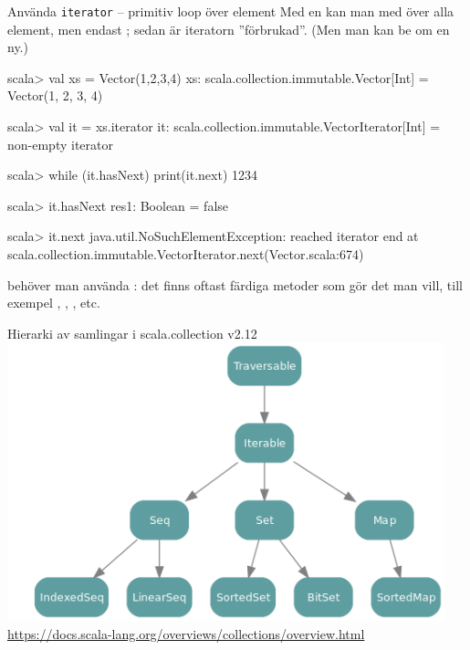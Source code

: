 \begin{Slide}{Använda \texttt{iterator} -- primitiv loop över element}\SlideFontSmall
Med en  kan man  med  över alla element, men endast ; sedan är iteratorn ''förbrukad''. (Men man kan be om en ny.)
\begin{REPL}
scala> val xs = Vector(1,2,3,4)
xs: scala.collection.immutable.Vector[Int] = Vector(1, 2, 3, 4)

scala> val it = xs.iterator
it: scala.collection.immutable.VectorIterator[Int] = non-empty iterator

scala> while (it.hasNext) print(it.next)
1234

scala> it.hasNext
res1: Boolean = false

scala> it.next
java.util.NoSuchElementException: reached iterator end
  at scala.collection.immutable.VectorIterator.next(Vector.scala:674)
\end{REPL}
 behöver man  använda : det finns oftast färdiga metoder som gör det man vill, till exempel , , ,  etc.
\end{Slide}






\ifkompendium
\else
\begin{Slide}{Hierarki av samlingar i scala.collection v2.12}\SlideFontTiny
\includegraphics[width=0.95\textwidth]{../img/collection/collection-traits}\\
\url{https://docs.scala-lang.org/overviews/collections/overview.html}
\end{Slide}
\fi





